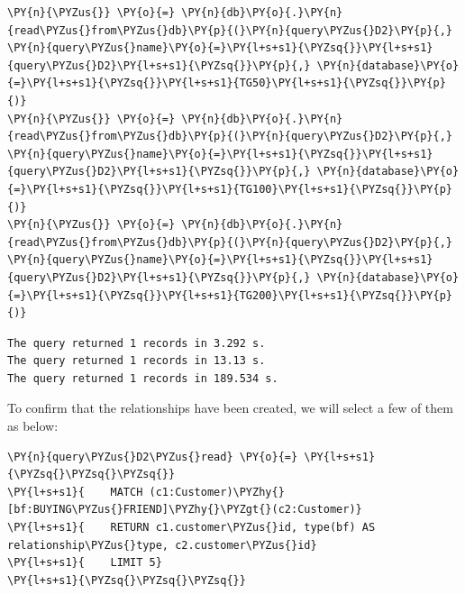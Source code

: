     \begin{tcolorbox}[breakable, size=fbox, boxrule=1pt, pad at break*=1mm,colback=cellbackground, colframe=cellborder]
\begin{Verbatim}[commandchars=\\\{\}]
\PY{n}{\PYZus{}} \PY{o}{=} \PY{n}{db}\PY{o}{.}\PY{n}{read\PYZus{}from\PYZus{}db}\PY{p}{(}\PY{n}{query\PYZus{}D2}\PY{p}{,} \PY{n}{query\PYZus{}name}\PY{o}{=}\PY{l+s+s1}{\PYZsq{}}\PY{l+s+s1}{query\PYZus{}D2}\PY{l+s+s1}{\PYZsq{}}\PY{p}{,} \PY{n}{database}\PY{o}{=}\PY{l+s+s1}{\PYZsq{}}\PY{l+s+s1}{TG50}\PY{l+s+s1}{\PYZsq{}}\PY{p}{)}
\PY{n}{\PYZus{}} \PY{o}{=} \PY{n}{db}\PY{o}{.}\PY{n}{read\PYZus{}from\PYZus{}db}\PY{p}{(}\PY{n}{query\PYZus{}D2}\PY{p}{,} \PY{n}{query\PYZus{}name}\PY{o}{=}\PY{l+s+s1}{\PYZsq{}}\PY{l+s+s1}{query\PYZus{}D2}\PY{l+s+s1}{\PYZsq{}}\PY{p}{,} \PY{n}{database}\PY{o}{=}\PY{l+s+s1}{\PYZsq{}}\PY{l+s+s1}{TG100}\PY{l+s+s1}{\PYZsq{}}\PY{p}{)}
\PY{n}{\PYZus{}} \PY{o}{=} \PY{n}{db}\PY{o}{.}\PY{n}{read\PYZus{}from\PYZus{}db}\PY{p}{(}\PY{n}{query\PYZus{}D2}\PY{p}{,} \PY{n}{query\PYZus{}name}\PY{o}{=}\PY{l+s+s1}{\PYZsq{}}\PY{l+s+s1}{query\PYZus{}D2}\PY{l+s+s1}{\PYZsq{}}\PY{p}{,} \PY{n}{database}\PY{o}{=}\PY{l+s+s1}{\PYZsq{}}\PY{l+s+s1}{TG200}\PY{l+s+s1}{\PYZsq{}}\PY{p}{)}
\end{Verbatim}
\end{tcolorbox}

    \begin{Verbatim}[commandchars=\\\{\}]
The query returned 1 records in 3.292 s.
The query returned 1 records in 13.13 s.
The query returned 1 records in 189.534 s.
    \end{Verbatim}

    To confirm that the relationships have been created, we will select a
few of them as below:

    \begin{tcolorbox}[breakable, size=fbox, boxrule=1pt, pad at break*=1mm,colback=cellbackground, colframe=cellborder]
\begin{Verbatim}[commandchars=\\\{\}]
\PY{n}{query\PYZus{}D2\PYZus{}read} \PY{o}{=} \PY{l+s+s1}{\PYZsq{}\PYZsq{}\PYZsq{}}
\PY{l+s+s1}{    MATCH (c1:Customer)\PYZhy{}[bf:BUYING\PYZus{}FRIEND]\PYZhy{}\PYZgt{}(c2:Customer)}
\PY{l+s+s1}{    RETURN c1.customer\PYZus{}id, type(bf) AS relationship\PYZus{}type, c2.customer\PYZus{}id}
\PY{l+s+s1}{    LIMIT 5}
\PY{l+s+s1}{\PYZsq{}\PYZsq{}\PYZsq{}}
\end{Verbatim}
\end{tcolorbox}

